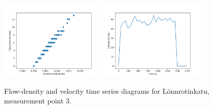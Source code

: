 \documentclass[english, 12pt, a4paper, elec, utf8, pdfa, online]{aaltothesis}
\begin{document}
\begin{figure}[ht!]
    \centering
    \includegraphics[width=0.45\textwidth]{graphs/Lonnrotinkatu_3_flw_dns.png}
    \includegraphics[width=0.45\textwidth]{graphs/Lonnrotinkatu_3_spd_time_6.png}
    \caption{Flow-density and velocity time series diagrams for Lönnrotinkatu, measurement point 3.}
\end{figure}
\end{document}
